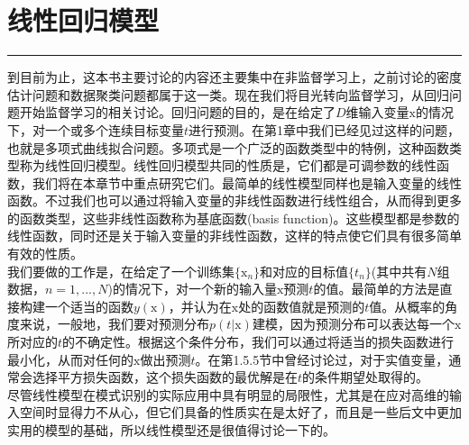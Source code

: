 \documentclass[b5paper]{book}
\renewcommand {\thetable} {\thechapter{}.\arabic{table}}
\renewcommand {\thefigure} {\thechapter{}.\arabic{figure}}
\numberwithin{equation}{chapter}
\newcommand {\bx} {\boldsymbol{\mathrm{x}}}
\begin{document}
	\chapter{线性回归模型}
	\noindent\rule[0.25\baselineskip]{\textwidth}{1pt}
	\renewcommand {\thetable} {\thechapter{}.\arabic{table}}
	\renewcommand {\thefigure} {\thechapter{}.\arabic{figure}}
	\textnormal{
	\indent 到目前为止，这本书主要讨论的内容还主要集中在非监督学习上，之前讨论的密度估计问题和数据聚类问题都属于这一类。现在我们将目光转向监督学习，从回归问题开始监督学习的相关讨论。回归问题的目的，是在给定了$D$维输入变量$\bx$的情况下，对一个或多个连续目标变量$t$进行预测。在第1章中我们已经见过这样的问题，也就是多项式曲线拟合问题。多项式是一个广泛的函数类型中的特例，这种函数类型称为线性回归模型。线性回归模型共同的性质是，它们都是可调参数的线性函数，我们将在本章节中重点研究它们。最简单的线性模型同样也是输入变量的线性函数。不过我们也可以通过将输入变量的非线性函数进行线性组合，从而得到更多的函数类型，这些非线性函数称为基底函数(basis function)。这些模型都是参数的线性函数，同时还是关于输入变量的非线性函数，这样的特点使它们具有很多简单有效的性质。\\
	\indent 我们要做的工作是，在给定了一个训练集$\{\bx_n\}$和对应的目标值$\{t_n\}$(其中共有$N$组数据，$n=1,...,N$)的情况下，对一个新的输入量$\bx$预测$t$的值。最简单的方法是直接构建一个适当的函数$y(\bx)$，并认为在$\bx$处的函数值就是预测的$t$值。从概率的角度来说，一般地，我们要对预测分布$p(t|\bx)$建模，因为预测分布可以表达每一个$\bx$所对应的$t$的不确定性。根据这个条件分布，我们可以通过将适当的损失函数进行最小化，从而对任何的$\bx$做出预测$t$。在第1.5.5节中曾经讨论过，对于实值变量，通常会选择平方损失函数，这个损失函数的最优解是在$t$的条件期望处取得的。\\
	\indent 尽管线性模型在模式识别的实际应用中具有明显的局限性，尤其是在应对高维的输入空间时显得力不从心，但它们具备的性质实在是太好了，而且是一些后文中更加实用的模型的基础，所以线性模型还是很值得讨论一下的。
	}
\end{document}
